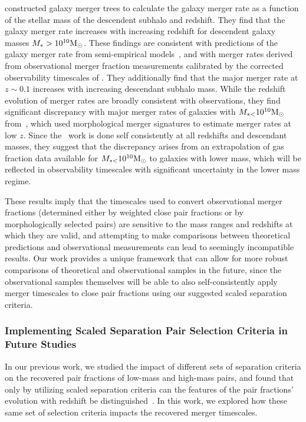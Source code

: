 \documentclass[twocolumn,linenumbers]{aastex631}
\begin{document}
            
            \citet{RG2015} constructed galaxy merger trees to calculate the galaxy merger rate as a function of the stellar mass of the descendent subhalo and redshift. 
            They find that the galaxy merger rate increases with increasing redshift for descendent galaxy masses $M_{*{}}>10^{10}\mathrm{M}_\odot$. 
            These findings are consistent with predictions of the galaxy merger rate from semi-empirical models~\citep{Stewart2009,Hopkins2010}, and with merger rates derived from observational merger fraction measurements calibrated by the corrected observability timescales of \citet{Lotz2011}.
            They additionally find that the major merger rate at $z\sim0.1$ increases with increasing descendant subhalo mass.
            While the redshift evolution of merger rates are broadly consistent with observations, they find significant discrepancy with major merger rates of galaxies with $M_{*{<}}10^{10}\mathrm{M}_\odot$ from~\citet{Casteels2014}, which used morphological merger signatures to estimate merger rates at low $z$. 
            Since the~\citet{RG2015} work is done self consistently at all redshifts and descendant masses, they suggest that the discrepancy arises from an extrapolation of gas fraction data available for $M_{*{<}}10^{10}\mathrm{M}_\odot$ to galaxies with lower mass, which will be reflected in observability timescales with significant uncertainty in the lower mass regime. 
            
            These results imply that the timescales used to convert observational merger fractions (determined either by weighted close pair fractions or by morphologically selected pairs) are sensitive to the mass ranges and redshifts at which they are valid, and attempting to make comparisons between theoretical predictions and observational measurements can lead to seemingly incompatible results. 
            Our work provides a unique framework that can allow for more robust comparisons of theoretical and observational samples in the future, since the observational samples themselves will be able to also self-consistently apply merger timescales to close pair fractions using our suggested scaled separation criteria.

        \subsubsection{Implementing Scaled Separation Pair Selection Criteria in Future Studies}
            In our previous work, we studied the impact of different sets of separation criteria on the recovered pair fractions of low-mass and high-mass pairs, and found that only by utilizing scaled separation criteria can the features of the pair fractions' evolution with redshift be distinguished~\citep{Chamberlain2024}. 
            In this work, we explored how these same set of selection criteria impacts the recovered merger timescales. 
        
\end{document}
